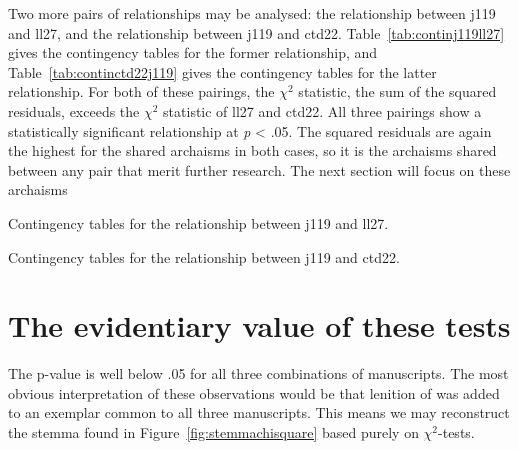 Two more pairs of relationships may be analysed: the relationship between \gls{j119} and \gls{ll27}, and the relationship between \gls{j119} and \gls{ctd22}. Table~\ref{tab:continj119ll27} gives the contingency tables for the former relationship, and Table~\ref{tab:continctd22j119} gives the contingency tables for the latter relationship. For both of these pairings, the \(\chi^2\) statistic, \ie the sum of the squared residuals, exceeds the \(\chi^2\) statistic of \gls{ll27} and \gls{ctd22}. All three pairings show a statistically significant relationship at \textit{p} < .05. The squared residuals are again the highest for the shared archaisms in both cases, so it is the archaisms shared between any pair that merit further research. The next section will focus on these archaisms

\begin{table}[h]
  \centering
  \hfill
  
  \caption{Contingency tables for the relationship between \gls{j119} and \gls{ll27}.}
  \label{tab:continj119ll27}
\end{table}

\begin{table}[h]
  \centering
  \hfill

  \caption{Contingency tables for the relationship between \gls{j119} and \gls{ctd22}.}
  \label{tab:continctd22j119}
\end{table}


\section{The evidentiary value of these tests}
\label{sec:evidence-from-these}



The p-value is well below .05 for all three combinations of manuscripts. The most obvious interpretation of these observations would be that lenition of  was added to an exemplar common to all three manuscripts. This means we may reconstruct the stemma found in Figure~\ref{fig:stemmachisquare} based purely on \(\chi^2\)-tests.

